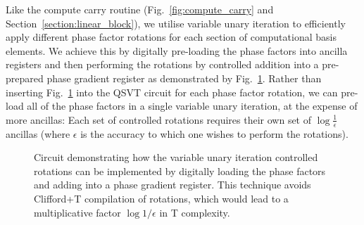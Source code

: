 Like the compute carry routine (Fig.~\ref{fig:compute_carry} and Section~\ref{section:linear_block}), we utilise variable unary iteration \cite{Sanders_2020} to efficiently apply different phase factor rotations for each section of computational basis elements. We achieve this by digitally pre-loading the phase factors into ancilla registers and then performing the rotations by controlled addition into a pre-prepared phase gradient register \cite{gidneyHalvingCostQuantum2018} as demonstrated by Fig.~\ref{fig:phase-gradient}. Rather than inserting Fig.~\ref{fig:phase-gradient} into the QSVT circuit for each phase factor rotation, we can pre-load all of the phase factors in a single variable unary iteration, at the expense of more ancillas: Each set of controlled rotations requires their own set of $\log \frac{1}{\epsilon}$ ancillas (where $\epsilon$ is the accuracy to which one wishes to perform the rotations). %
\begin{figure}
\centering

\caption{\label{fig:phase-gradient} Circuit demonstrating how the variable unary iteration controlled rotations can be implemented by digitally loading the phase factors and adding into a phase gradient register. This technique avoids Clifford+T compilation of rotations\cite{Bocharov_2015}, which would lead to a multiplicative factor $\log 1/\epsilon$ in T complexity.}
\end{figure}

